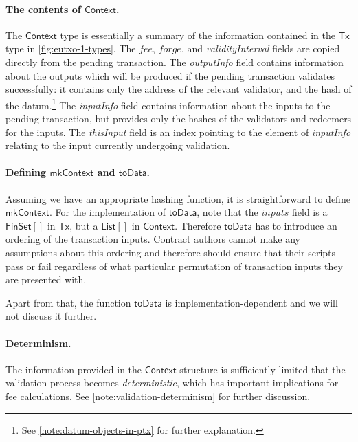 \documentclass[a4paper]{article}
\newcounter{note}
\renewcommand{\i}{\textit}  %
\newcommand{\s}{\textsf}  %
\newcommand{\msf}[1]{\ensuremath{\mathsf{#1}}}
\newcommand{\mi}[1]{\ensuremath{\mathit{#1}}}
\newcommand{\List}[1]{\ensuremath{\s{List}[#1]}}
\newcommand{\FinSet}[1]{\ensuremath{\s{FinSet}[#1]}}
\newcommand{\ctx}{\ensuremath{\s{Context}}}
\newcommand{\toData}{\ensuremath{\s{toData}}}
\newcommand{\mkContext}{\ensuremath{\s{mkContext}}}
\newcommand{\forge}{\mi{forge}}
\newcommand{\fee}{\mi{fee}}
\newcommand{\eutxotx}{\msf{Tx}}
\begin{document}
\paragraph{The contents of \ctx{}.}
The \ctx{} type is essentially a summary of the information contained
in the $\eutxotx$ type in \cref{fig:eutxo-1-types}. The \fee{},
\forge{}, and \i{validityInterval} fields are copied directly from the
pending transaction.  The \i{outputInfo} field contains information
about the outputs which will be produced if the pending transaction
validates successfully: it contains only the address of the relevant
validator, and the hash of the datum.\footnote{See
  \cref{note:datum-objects-in-ptx} for further explanation.}  The
\i{inputInfo} field contains information about the inputs to the
pending transaction, but provides only the hashes of the validators
and redeemers for the inputs.  The \i{thisInput} field
is an index pointing to the element of \i{inputInfo} relating to the
input currently undergoing validation.

\paragraph{Defining \mkContext{} and \toData.}
Assuming we have an
appropriate hashing function, it is straightforward to define \mkContext.
For the implementation of \toData, note that the $inputs$ field is a
\FinSet{} in \eutxotx{}, but a \List{} in \ctx{}. Therefore \toData{} has to introduce
an ordering of the transaction inputs. Contract authors cannot make
any assumptions about this ordering and therefore should ensure that
their scripts pass or fail regardless of what particular permutation
of transaction inputs they are presented with.

Apart from that, the function \toData{} is implementation-dependent and
we will not discuss it further.

\paragraph{Determinism.}
The information provided in the \ctx{}
structure is sufficiently limited that the validation process
becomes \textit{deterministic},  which has important implications
for fee calculations.  See \cref{note:validation-determinism}
for further discussion.
\end{document}
